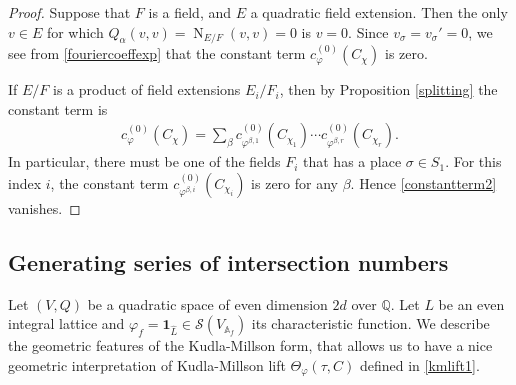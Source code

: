 \documentclass[11pt]{article} %
\newcommand{\8}{\infty}
\newcommand{\id}{\mathbf{1}}
\newcommand{\A}{\mathbb{A}}
\newcommand{\Q}{\mathbb{Q}}
\newcommand{\Lhat}{\widehat{L}}
\newcommand{\N}{\operatorname{N}}
\newcommand{\Scal}{\mathcal{S}}
\newcommand{\fin}{f}
\theoremstyle{mytheoremstyle}
\theoremstyle{remark}
\numberwithin{equation}{section}
\begin{document}
\begin{proof}
 Suppose that $F$ is a field, and $E$ a quadratic field extension. Then the only $v \in E$ for which $Q_\alpha(v,v)=\N_{E/F}(v,v)=0$ is $v=0$. Since $v_\sigma=v_\sigma'=0$, we see from \eqref{fouriercoeffexp} that the constant term $c^{(0)}_\varphi(C_\chi)$ is zero.
 
If $E/F$ is a product of field extensions $E_i/F_i$, then by Proposition \ref{splitting} the constant term is
\begin{align} \label{constantterm2}
    c^{(0)}_\varphi(C_\chi)=\sum_{\beta} c^{(0)}_{\varphi^{\beta,1}}(C_{\chi_1}) \cdots c^{(0)}_{\varphi^{\beta,r}}(C_{\chi_r}).
    \end{align}
In particular, there must be one of the fields $F_i$ that has a place $\sigma \in S_1$. For this index $i$, the constant term $c^{(0)}_{\varphi^{\beta,i}}(C_{\chi_i})$ is zero for any $\beta$. Hence \eqref{constantterm2} vanishes.
\end{proof}
\subsection{Generating series of intersection numbers} \label{sec:genseries} Let $(V,Q)$ be a quadratic space of even dimension $2d$ over $\Q$. Let $L$ be an even integral lattice and $\varphi_\fin=\id_{\Lhat} \in \Scal(V_{\A_\fin})$ its characteristic function. We describe the geometric features of the Kudla-Millson form, that allows us to have a nice geometric interpretation of Kudla-Millson lift $\Theta_\varphi(\tau,C)$ defined in \eqref{kmlift1}.
\end{document}
